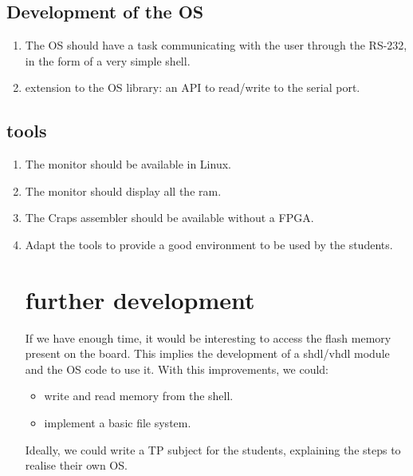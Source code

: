 \documentclass{article}
\begin{document}
      \subsection{Development of the OS}
        \begin{enumerate}
          \item The OS should have a task communicating with the user through
            the RS-232, in the form of a very simple shell.
          \item extension to the OS library: an API to read/write to the serial 
              port.
        \end{enumerate}
      \subsection{tools}
        \begin{enumerate}
          \item The monitor should be available in Linux.
          \item The monitor should display all the ram.
          \item The Craps assembler should be available without a FPGA.
          \item Adapt the tools to provide a good environment to be used by the
            students.

      \section{further development}
        If we have enough time, it would be interesting to access the flash
        memory present on the board. This implies the development of a shdl/vhdl
        module and the OS code to use it. With this improvements, we could:
        \begin{itemize}
          \item write and read memory from the shell.
          \item implement a basic file system.
        \end{itemize}
        Ideally, we could write a TP subject for the students, explaining the
        steps to realise their own OS.


\newpage
  \begin{appendix}

\end{appendix}
\end{enumerate}
\end{document}
